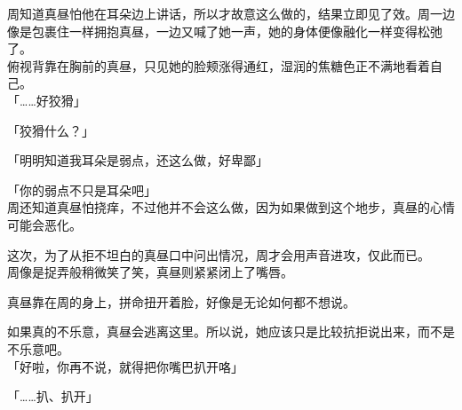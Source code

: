 周知道真昼怕他在耳朵边上讲话，所以才故意这么做的，结果立即见了效。周一边像是包裹住一样拥抱真昼，一边又喊了她一声，她的身体便像融化一样变得松弛了。\\

俯视背靠在胸前的真昼，只见她的脸颊涨得通红，湿润的焦糖色正不满地看着自己。\\

「……好狡猾」

「狡猾什么？」

「明明知道我耳朵是弱点，还这么做，好卑鄙」

「你的弱点不只是耳朵吧」\\

周还知道真昼怕挠痒，不过他并不会这么做，因为如果做到这个地步，真昼的心情可能会恶化。

这次，为了从拒不坦白的真昼口中问出情况，周才会用声音进攻，仅此而已。\\

周像是捉弄般稍微笑了笑，真昼则紧紧闭上了嘴唇。

真昼靠在周的身上，拼命扭开着脸，好像是无论如何都不想说。

如果真的不乐意，真昼会逃离这里。所以说，她应该只是比较抗拒说出来，而不是不乐意吧。\\

「好啦，你再不说，就得把你嘴巴扒开咯」

「……扒、扒开」\\

